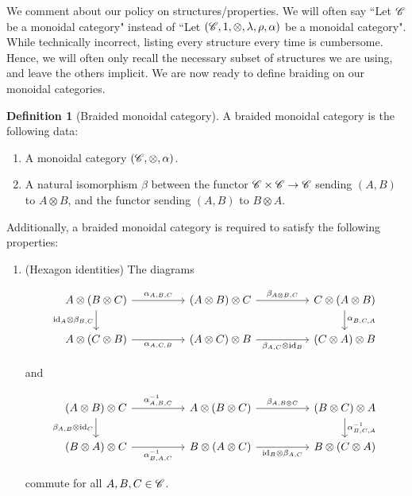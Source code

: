 \documentclass{article}
\theoremstyle{definition}
\newtheorem*{definition}{Definition}
\numberwithin{figure}{section}
\begin{document}
We comment about our policy on structures/properties. We will often say ``Let $\mathscr{C}$ be a monoidal category" instead of ``Let $(\mathscr{C},1,\otimes,\lambda,\rho,\alpha)$ be a monoidal category". While technically incorrect, listing every structure every time is cumbersome. Hence, we will often only recall the necessary subset of structures we are using, and leave the others implicit. We are now ready to define braiding on our monoidal categories.

\begin{definition}[Braided monoidal category] A braided monoidal category is the following data:

\begin{enumerate}
\item A monoidal category $(\mathscr{C},\otimes,\alpha)$.
\item A natural isomorphism $\beta$ between the functor $\mathscr{C}\times \mathscr{C}\to \mathscr{C}$ sending $(A,B)$ to $A\otimes B$, and the functor sending $(A,B)$ to $B\otimes A$.
\end{enumerate}

Additionally, a braided monoidal category is required to satisfy the following properties:

\begin{enumerate}
\item (Hexagon identities) The diagrams

\[\begin{tikzcd}
	{A\otimes (B\otimes C)} && {(A\otimes B)\otimes C} && {C\otimes (A\otimes B)} \\
	{A\otimes (C\otimes B)} && {(A\otimes C)\otimes B} && {(C\otimes A)\otimes B}
	\arrow["{\alpha_{A,B,C}}", from=1-1, to=1-3]
	\arrow["{\beta_{A\otimes B,C}}", from=1-3, to=1-5]
	\arrow["{\alpha^{}_{B,C,A}}", from=1-5, to=2-5]
	\arrow["{\id_A\otimes \beta_{B,C}}"', from=1-1, to=2-1]
	\arrow["{\alpha_{A,C,B}}"', from=2-1, to=2-3]
	\arrow["{\beta_{A,C}\otimes \id_B}"', from=2-3, to=2-5]
\end{tikzcd}\]

and

\[\begin{tikzcd}
	{(A\otimes B)\otimes C} && {A\otimes (B\otimes C)} && {(B\otimes C)\otimes A} \\
	{(B\otimes A)\otimes C} && {B\otimes (A\otimes C)} && {B\otimes (C\otimes A)}
	\arrow["{\alpha^{-1}_{A,B,C}}", from=1-1, to=1-3]
	\arrow["{\beta_{A,B\otimes C}}", from=1-3, to=1-5]
	\arrow["{\alpha^{-1}_{B,C,A}}", from=1-5, to=2-5]
	\arrow["{\beta_{A,B}\otimes \id_C}"', from=1-1, to=2-1]
	\arrow["{\alpha^{-1}_{B,A,C}}"', from=2-1, to=2-3]
	\arrow["{\id_B\otimes \beta_{A,C}}"', from=2-3, to=2-5]
\end{tikzcd}\]

commute for all $A,B,C\in \mathscr{C}$.
\end{enumerate}

\raggedleft\qedsymbol{}
\end{definition}
\end{document}
